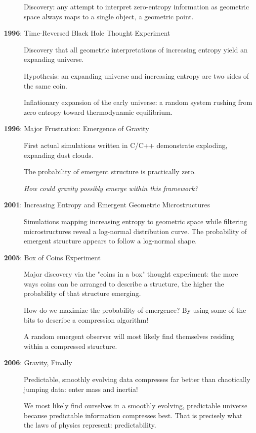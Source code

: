 \begin{description}
  Discovery: any attempt to interpret zero-entropy information as geometric space always maps to a single object, a geometric point.

\item[\textbf{1996}: Time-Reversed Black Hole Thought Experiment]
  Discovery that all geometric interpretations of increasing entropy yield an expanding universe.

  Hypothesis: an expanding universe and increasing entropy are two sides of the same coin.

  Inflationary expansion of the early universe: a random system rushing from zero entropy toward thermodynamic equilibrium.

\item[\textbf{1996}: Major Frustration: Emergence of Gravity]
  First actual simulations written in C/C++ demonstrate exploding, expanding dust clouds.

  The probability of emergent structure is practically zero.

  \textit{How could gravity possibly emerge within this framework?}

\item[\textbf{2001}: Increasing Entropy and Emergent Geometric Microstructures]
  Simulations mapping increasing entropy to geometric space while filtering microstructures reveal a log-normal distribution curve. The probability of emergent structure appears to follow a log-normal shape.

\item[\textbf{2005}: Box of Coins Experiment]
  Major discovery via the "coins in a box" thought experiment: the more ways coins can be arranged to describe a structure, the higher the probability of that structure emerging.

  How do we maximize the probability of emergence? By using some of the bits to describe a compression algorithm!

  A random emergent observer will most likely find themselves residing within a compressed structure.

\item[\textbf{2006}: Gravity, Finally]
  Predictable, smoothly evolving data compresses far better than chaotically jumping data: enter mass and inertia!

  We most likely find ourselves in a smoothly evolving, predictable universe because predictable information compresses best. That is precisely what the laws of physics represent: predictability.


\end{description}
